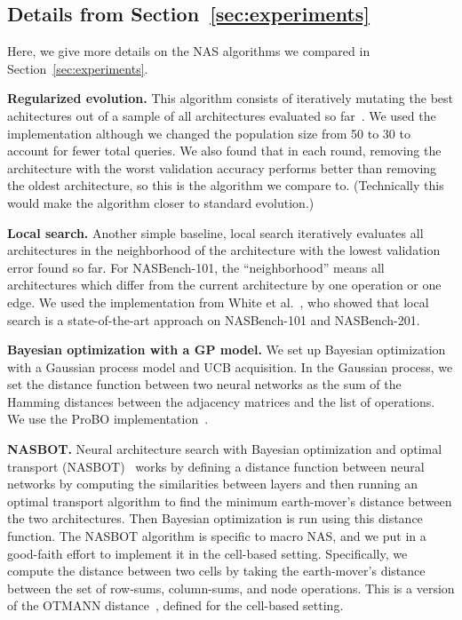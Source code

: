 \documentclass[11pt]{article}
\numberwithin{equation}{section}
\numberwithin{figure}{section}
\theoremstyle{plain}
\theoremstyle{definition}
\let\citet\cite
\begin{document}
\subsection{Details from Section~\ref{sec:experiments}} \label{app:experiments:details}
Here, we give more details on the NAS algorithms we compared
in Section~\ref{sec:experiments}.

\textbf{Regularized evolution.} 
This algorithm consists of iteratively mutating the best achitectures
out of a sample of all architectures evaluated so 
far~\cite{real2019regularized}.
We used the~\cite{nasbench} implementation although we
changed the population size from 50 to 30 to account for fewer total queries.
We also found that in each round, removing the architecture with the worst validation
accuracy performs better than removing the oldest architecture, so this is the
algorithm we compare to. (Technically this would make the algorithm 
closer to standard evolution.)

\textbf{Local search.} 
Another simple baseline, local search iteratively evaluates all architectures
in the neighborhood of the architecture with the lowest validation error found so
far. For NASBench-101, the ``neighborhood'' means all architectures which differ
from the current architecture by one operation or one edge.
We used the implementation from White et al.~\citet{white2020local},
who showed that local search is a state-of-the-art
approach on NASBench-101 and NASBench-201.

\textbf{Bayesian optimization with a GP model.}
We set up Bayesian optimization with a Gaussian process model and UCB acquisition.
In the Gaussian process, we set the distance function between two neural networks
as the sum of the Hamming distances between the adjacency matrices and the list of operations.
We use the ProBO implementation~\cite{neiswanger2019probo}.

\textbf{NASBOT.}
Neural architecture search with Bayesian optimization 
and optimal transport (NASBOT)~\cite{nasbot} 
works by defining a distance function
between neural networks by computing the similarities between layers
and then running an optimal transport algorithm to find the minimum
earth-mover's distance between the two architectures.
Then Bayesian optimization is run using this distance function.
The NASBOT algorithm is specific to macro NAS, and we put in 
a good-faith effort to implement it in the cell-based setting.
Specifically, we compute the distance between two cells by taking
the earth-mover's distance between the set of row-sums, column-sums,
and node operations.
This is a version of the OTMANN distance~\cite{nasbot}, 
defined for the cell-based setting.
\end{document}
